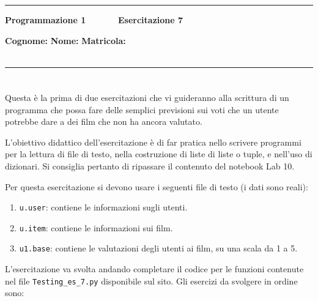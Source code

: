 \documentclass[11pt,a4]{article}
\begin{document}
\thispagestyle{empty}
\hrule
\begin{center}
   {\Large {\bf Programmazione 1 \hspace{3cm} $\quad \quad \quad$ Esercitazione 7}}
\end{center}
{\bf Cognome: }\hspace{2.5cm} {\bf Nome: } \hspace{2.5cm} {\bf Matricola: } \\\
\hrule

\section*{}
Questa è la prima di due esercitazioni che vi guideranno alla scrittura di un programma che possa fare delle semplici previsioni
sui voti che un utente potrebbe dare a dei film che non ha ancora valutato.

L'obiettivo didattico dell'esercitazione è di far pratica nello scrivere programmi per la lettura di file di testo, 
nella costruzione di liste di liste o tuple, e nell'uso di dizionari. Si consiglia pertanto di ripassare
il contenuto del notebook Lab 10.

Per questa esercitazione si devono usare i seguenti file di testo (i dati sono reali):
\begin{enumerate}
\item {\tt u.user}: contiene le informazioni sugli utenti.
\item {\tt u.item}: contiene le informazioni sui film.
\item {\tt u1.base}: contiene le valutazioni degli utenti ai film, su una scala da 1 a 5. 
\end{enumerate}

L'esercitazione va svolta andando completare il codice per le funzioni contenute nel file {\tt Testing\_es\_7.py} disponibile sul sito. Gli esercizi da svolgere in ordine sono:
\end{document}
